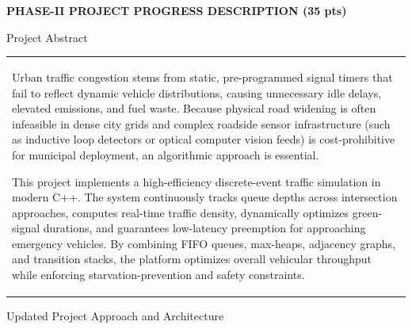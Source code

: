 \documentclass[12pt,a4paper]{article}
\newcommand{\sectiontitle}[1]{%
    {\color{GEUBlue}
    \fontsize{16.5}{20}\selectfont #1}
}
\newcommand{\instruction}[1]{%
    {\color{InstructionGrey}
    \fontsize{9.5}{12}\selectfont #1}
}
\newcommand{\answerbox}[2]{%
    \noindent
    \begin{tabularx}{\textwidth}{
        |>{\raggedright\arraybackslash}X|}
        \hline
        \parbox[t][#1][t]{\dimexpr\linewidth-12pt\relax}{
            \vspace{4pt}
            \fontsize{10}{13.5}\selectfont #2
        }\\
        \hline
    \end{tabularx}
}
\begin{document}
\newpage

\vspace*{0.05cm}

\noindent
\colorbox{GEUBannerBlue}{%
\parbox{\dimexpr\textwidth-2\fboxsep\relax}{
    \vspace{0.15cm}
    {\color{GEUYellow}
    \fontsize{15.5}{19}\selectfont
    \bfseries
    PHASE-II PROJECT PROGRESS DESCRIPTION (35 pts)}
    \vspace{0.15cm}
}}

\vspace{0.45cm}

\sectiontitle{Project Abstract}

\vspace{0.03cm}

\instruction{

}

\vspace{0.15cm}

\answerbox{4.60cm}{Urban traffic congestion stems from static, pre-programmed signal timers that fail to reflect dynamic vehicle distributions, causing unnecessary idle delays, elevated emissions, and fuel waste. Because physical road widening is often infeasible in dense city grids and complex roadside sensor infrastructure (such as inductive loop detectors or optical computer vision feeds) is cost-prohibitive for municipal deployment, an algorithmic approach is essential.

This project implements a high-efficiency discrete-event traffic simulation in modern C++. The system continuously tracks queue depths across intersection approaches, computes real-time traffic density, dynamically optimizes green-signal durations, and guarantees low-latency preemption for approaching emergency vehicles. By combining FIFO queues, max-heaps, adjacency graphs, and transition stacks, the platform optimizes overall vehicular throughput while enforcing starvation-prevention and safety constraints.}

\vspace{0.50cm}

\sectiontitle{Updated Project Approach and Architecture}

\vspace{0.03cm}

\instruction{

}
\end{document}
